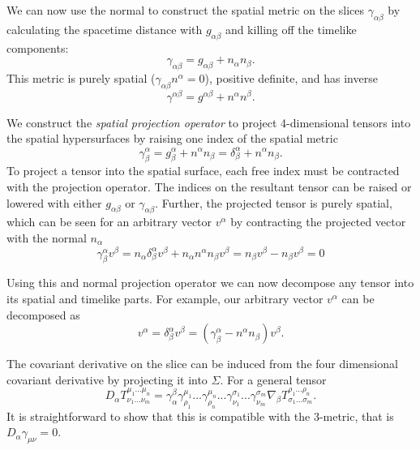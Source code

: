 We can now use the normal to construct the spatial metric on the slices $\gamma_{\alpha \beta}$ by calculating the spacetime distance with $g_{\alpha \beta}$ and killing off the timelike components:
\begin{equation}
\label{eq:spatialmetric}
\gamma_{\alpha \beta}=g_{\alpha \beta}+n_\alpha n_\beta.
\end{equation}
This metric is purely spatial ($\gamma_{\alpha \beta} n^{\alpha}=0$), positive definite, and has inverse
\begin{equation}
\label{eq:spatialmetricinverse}
\gamma^{\alpha \beta}=g^{\alpha \beta}+n^\alpha n^\beta.
\end{equation}

We construct the \textit{spatial projection operator} to project 4-dimensional tensors into the spatial hypersurfaces by raising one index of the spatial metric
\begin{equation}
\gamma^\alpha_\beta = g^\alpha_\beta + n^\alpha n_\beta = \delta^\alpha_\beta + n^\alpha n_\beta. 
\end{equation} 
To project a tensor into the spatial surface, each free index must be contracted with the projection operator. The indices on the resultant tensor can be raised or lowered with either $g_{\alpha \beta}$ or $\gamma_{\alpha \beta}$. Further, the projected tensor is purely spatial, which can be seen for an arbitrary vector $v^\alpha$ by contracting the projected vector with the normal $n_\alpha$
\begin{equation}
\gamma^\alpha _\beta v^\beta = n_\alpha \delta^\alpha_\beta v^\beta + n_\alpha n^\alpha n_\beta v^\beta = n_\beta v^\beta - n_\beta v^\beta = 0
\end{equation}

Using this and normal projection operator we can now decompose any tensor into its spatial and timelike parts. For example, our arbitrary vector $v^\alpha$ can be decomposed as 
\begin{equation}
v^\alpha = \delta^\alpha_\beta v^\beta = (\gamma^\alpha_\beta - n^\alpha n_\beta)v^\beta.
\end{equation}

The covariant derivative on the slice can be induced from the four dimensional covariant derivative by projecting it into $\Sigma$. For a general tensor
\begin{equation}
D_\alpha T^{\mu_1 ... \mu_n}_{\nu_1 ... \nu_m}=\gamma^{\beta}_{\alpha} \gamma^{\mu_1}_{\rho_1}... \gamma^{\mu_n}_{\rho_n}...\gamma^{\sigma_1}_{\nu_1}... \gamma^{\sigma_m}_{\nu_m}\nabla_\beta T^{\rho_1 ... \rho_n}_{\sigma_1 ... \sigma_m}.
\end{equation}
It is straightforward to show that this is compatible with the 3-metric, that is $D_\alpha \gamma_{\mu \nu}=0$.  

